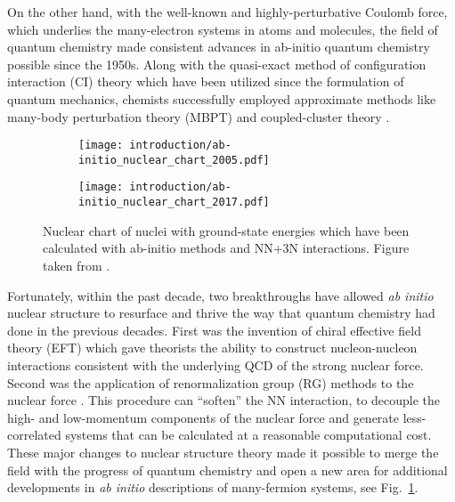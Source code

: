 \documentclass[../thesis.tex]{subfiles}
\begin{document}
On the other hand, with the well-known and highly-perturbative Coulomb force, which underlies the many-electron systems in atoms and molecules, the field of quantum chemistry made consistent advances in ab-initio quantum chemistry possible since the 1950s.  Along with the quasi-exact method of configuration interaction (CI) theory \cite{SLATER19291293,CONDON19301121,BACHER1933264,UFFORD1933732} which have been utilized since the formulation of quantum mechanics, chemists successfully employed approximate methods like many-body perturbation theory (MBPT) \cite{HUBBARD1957539,HUGENHOLTZ1957481,SCHAEFER1984,SHAVITT2009} and coupled-cluster theory \cite{CIZEK19664256,CIZEK1971359,CIZEK1980251,PIECUCH2002527,SHAVITT2009}.

\begin{figure}[h]
  \centering
  \begin{subfigure}{0.7\textwidth}
    \centering
    \texttt{[image: introduction/ab-initio\_nuclear\_chart\_2005.pdf]}
  \end{subfigure}
  
  \begin{subfigure}{0.7\textwidth}
    \centering
    \texttt{[image: introduction/ab-initio\_nuclear\_chart\_2017.pdf]}
  \end{subfigure}
  \caption{Nuclear chart of nuclei with ground-state energies which have been calculated with ab-initio methods and NN+3N interactions.  Figure taken from \cite{HERGERTPRIVATE}.}
  \label{fig:AbInitioChart}
\end{figure}

Fortunately, within the past decade, two breakthroughs have allowed \emph{ab initio} nuclear structure to resurface and thrive the way that quantum chemistry had done in the previous decades.  First was the invention of chiral effective field theory (EFT) \cite{EPELBAUM20091773,MACHLEIDT20111} which gave theorists the ability to construct nucleon-nucleon interactions consistent with the underlying QCD of the strong nuclear force.  Second was the application of renormalization group (RG) methods to the nuclear force \cite{BOGNER201094,ROTH2011072501}.  This procedure can ``soften'' the NN interaction, to decouple the high- and low-momentum components of the nuclear force and generate less-correlated systems that can be calculated at a reasonable computational cost.  These major changes to nuclear structure theory made it possible to merge the field with the progress of quantum chemistry and open a new area for additional developments in \emph{ab initio} descriptions of many-fermion systems, see Fig.\ \ref{fig:AbInitioChart}.
\end{document}
